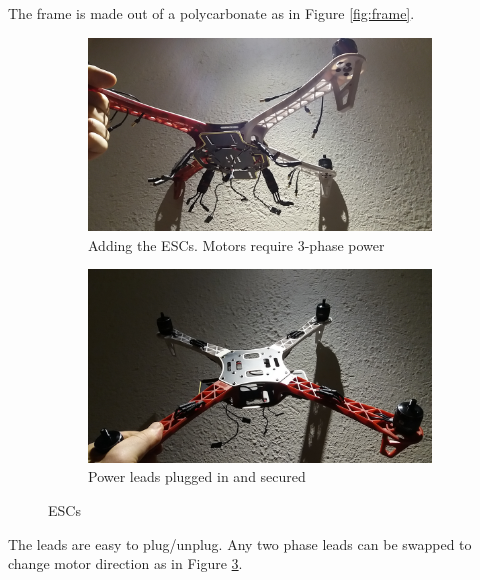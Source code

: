 \noindent
The frame is made out of a polycarbonate as in Figure \ref{fig:frame}.\\

\begin{figure}[H]
\begin{subfigure}{0.5\textwidth}
\centering
\includegraphics[scale=0.1]{images/drone-build-esc-3phaseunconnected.jpg}
\caption{Adding the ESCs. Motors require 3-phase power}
\label{fig:ESCs_uplugged}
\end{subfigure}
\begin{subfigure}{0.5\textwidth}
\centering
\includegraphics[scale=0.1]{images/drone-build-esc-3phaseconnected.jpg}
\caption{Power leads plugged in and secured}
\label{fig:ESCs_plugged}
\end{subfigure}
\caption{ESCs}
\label{fig:ESC}
\end{figure}

\noindent
The leads are easy to plug/unplug. Any two phase leads can be swapped to change motor direction as in Figure \ref{fig:ESC}.\\

